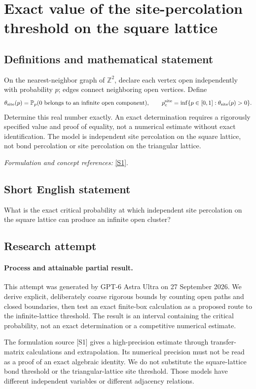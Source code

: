 \documentclass[11pt]{article}
\begin{document}
\section*{\texorpdfstring{Exact value of the site-percolation threshold on the square lattice}{Exact value of the site-percolation threshold on the square lattice}}\label{30006931}
\subsection{Definitions and mathematical statement}
On the nearest-neighbor graph of ${\mathbb{Z}}^2$, declare each vertex open independently with probability $p$; edges connect neighboring open vertices. Define
\[
 \theta_{\rm site}(p)={\mathbb{P}}_p(0\text{ belongs to an infinite open component}),
 \qquad
 p_c^{\rm site}=\inf\{p\in[0,1]:\theta_{\rm site}(p)>0\}.
\]
Determine this real number exactly. An exact determination requires a rigorously specified value and proof of equality, not a numerical estimate without exact identification. The model is independent site percolation on the square lattice, not bond percolation or site percolation on the triangular lattice.
\par\smallskip\textit{Formulation and concept references:} \href{https://arxiv.org/abs/1507.03027}{[S1]}.

\subsection{Short English statement}
What is the exact critical probability at which independent site percolation on the square lattice can produce an infinite open cluster?
\subsection{Research attempt}
\paragraph{Process and attainable partial result.}
This attempt was generated by GPT-6 Astra Ultra on 27 September 2026. We derive explicit, deliberately coarse rigorous bounds by counting open paths and closed boundaries, then test an exact finite-box calculation as a proposed route to the infinite-lattice threshold. The result is an interval containing the critical probability, not an exact determination or a competitive numerical estimate.

The formulation source [S1] gives a high-precision estimate through transfer-matrix calculations and extrapolation. Its numerical precision must not be read as a proof of an exact algebraic identity. We do not substitute the square-lattice bond threshold or the triangular-lattice site threshold. Those models have different independent variables or different adjacency relations.
\end{document}
